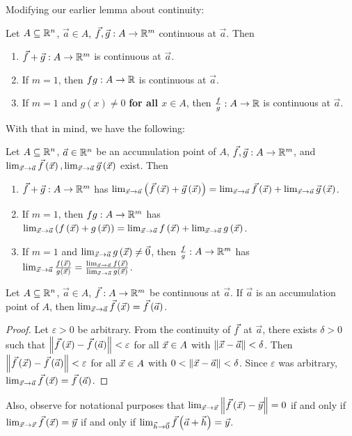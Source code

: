 \documentclass[main.tex]{subfiles}
\begin{document}
Modifying our earlier lemma about continuity:
\begin{lemma}
    Let $A\subseteq \mathbb R^n$, $\vec{a}\in A$, $\vec{f}, \vec{g} : A\to \mathbb R^m$ continuous at $\vec{a}$. Then
    \begin{enumerate}
        \item $\vec{f} + \vec{g} : A\to \mathbb R^m$ is continuous at $\vec{a}$.
        \item If $m = 1$, then $fg : A\to \mathbb R$ is continuous at $\vec{a}$.
        \item If $m = 1$ and $g(x)\neq 0$ \textbf{for all $x\in A$}, then $\frac{f}{g} : A\to \mathbb R$ is continuous at $\vec{a}$.
    \end{enumerate}
\end{lemma}

With that in mind, we have the following:
\begin{lemma}
    Let $A\subseteq \mathbb R^n$, $\vec{a}\in \mathbb R^n$ be an accumulation point of $A$, $\vec{f}, \vec{g} : A\to \mathbb R^m$, and $\lim_{\vec{x}\to \vec{a}} \vec{f}\left( \vec{x} \right), \lim_{\vec{x}\to\vec{a}}\vec{g}\left( \vec{x} \right)$ exist. Then
    \begin{enumerate}
        \item $\vec{f} + \vec{g} : A\to \mathbb R^m$ has $\lim_{\vec{x}\to \vec{a}}\left( \vec{f}\left( \vec{x} \right) + \vec{g}\left( \vec{x} \right) \right) = \lim_{\vec{x}\to \vec{a}} \vec{f}\left( \vec{x} \right) + \lim_{\vec{x}\to \vec{a}}\vec{g}\left( \vec{x} \right)$.
        \item If $m = 1$, then $fg : A\to \mathbb R^m$ has $\lim_{\vec{x}\to \vec{a}}\left( f\left( \vec{x} \right) + g\left( \vec{x} \right) \right) = \lim_{\vec{x}\to \vec{a}} f\left( \vec{x} \right) + \lim_{\vec{x}\to \vec{a}}g\left( \vec{x} \right)$.
        \item If $m = 1$ and $\lim_{\vec{x}\to \vec{a}} g\left( \vec{x} \right) \neq \vec{0}$, then $\frac{f}{g} : A\to \mathbb R^m$ has $\lim_{\vec{x}\to \vec{a}}\frac{f\left( \vec{x} \right)}{g\left( \vec{x} \right)} = \frac{\lim_{\vec{x}\to \vec{a}} f\left( \vec{x} \right)}{\lim_{\vec{x}\to \vec{a}}g\left( \vec{x} \right)}$.
    \end{enumerate}
\end{lemma}

\begin{proposition}
    Let $A\subseteq \mathbb R^n$, $\vec{a}\in A$, $\vec{f} : A\to \mathbb R^m$ be continuous at $\vec{a}$. If $\vec{a}$ is an accumulation point of $A$, then $\lim_{\vec{x}\to \vec{a}} \vec{f}\left( \vec{x} \right) = \vec{f}\left( \vec{a} \right)$.
\end{proposition}

\begin{proof}
    Let $\varepsilon > 0$ be arbitrary. From the continuity of $\vec{f}$ at $\vec{a}$, there exists $\delta > 0$ such that $\left\lVert \vec{f}\left( \vec{x} \right) - \vec{f}\left( \vec{a} \right) \right\rVert < \varepsilon$ for all $\vec{x}\in A$ with $\left\lVert \vec{x} - \vec{a} \right\rVert < \delta$. Then $\left\lVert \vec{f}\left( \vec{x} \right) - \vec{f}\left( \vec{a} \right) \right\rVert < \varepsilon$ for all $\vec{x}\in A$ with $0 < \left\lVert \vec{x} - \vec{a} \right\rVert < \delta$. Since $\varepsilon$ was arbitrary, $\lim_{\vec{x}\to \vec{a}} \vec{f}\left( \vec{x} \right) = \vec{f}\left( \vec{a} \right)$.
\end{proof}

Also, observe for notational purposes that $\lim_{\vec{x}\to \vec{x}} \left\lVert \vec{f}\left( \vec{x} \right) - \vec{y} \right\rVert = 0$ if and only if $\lim_{\vec{x}\to \vec{x}}\vec{f}\left( \vec{x} \right) = \vec{y}$ if and only if $\lim_{\vec{h}\to\vec{0}} \vec{f}\left( \vec{a} + \vec{h} \right) = \vec{y}$.
\end{document}
